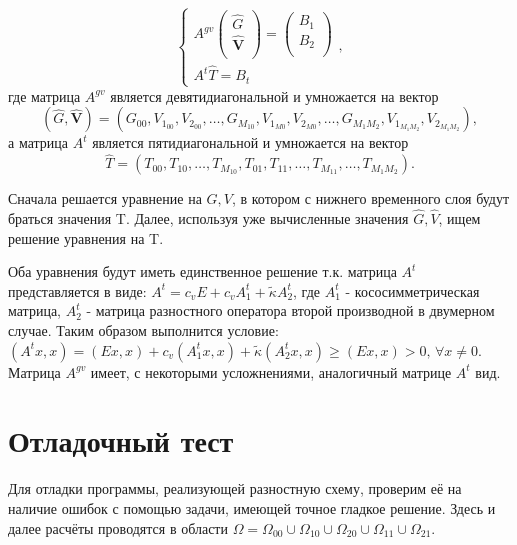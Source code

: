 \documentclass[a4paper]{article}
\theoremstyle{definition}
\numberwithin{equation}{section}
\begin{document}
$$\begin{cases}
A^{gv}
\left( \begin{matrix}
\hat{G}\\
\hat{\mathbf{V}}\\
\end{matrix} \right) = 
\left( \begin{matrix}
B_1\\
B_2\\
\end{matrix} \right) \\
A^t \hat{T} = B_t
\end{cases},$$
где матрица $A^{gv}$ является девятидиагональной и умножается на вектор $$(\hat{G},\hat{\mathbf{V}}) = (G_{00},V_{1_{00}},V_{2_{00}},\dots,G_{M_10},V_{1_{M0}},V_{2_{M0}}, \dots, G_{M_1M_2},V_{1_{M_1M_2}},V_{2_{M_1M_2}}),$$
а матрица $A^t$ является пятидиагональной и умножается на вектор $$\hat{T}=(T_{00},T_{10},\dots,T_{M_10},T_{01}, T_{11}, \dots, T_{M_11},\dots, T_{M_1M_2}).$$

Сначала решается уравнение на $G, V$, в котором с нижнего временного слоя будут браться значения T. Далее, используя уже вычисленные значения $\hat{G}, \hat{V}$, ищем решение уравнения на T.

Оба уравнения будут иметь единственное решение т.к. матрица $A^t$ представляется в виде: $A^t=c_vE + c_vA_1^t + \tilde{\kappa} A_2^t$, где $A_1^t$ - кососимметрическая матрица, $A_2^t$ - матрица разностного оператора второй производной в двумерном случае. Таким образом выполнится условие: $(A^tx,x)= (Ex,x)+c_v(A^t_1x,x)+\tilde{\kappa}(A^t_2x,x)\geq(Ex,x)>0, \, \forall x\neq0$. Матрица $A^{gv}$ имеет, с некоторыми усложнениями, аналогичный матрице $A^t$ вид.







\newpage
\section{Отладочный тест}

Для отладки программы, реализующей разностную схему, проверим её на наличие ошибок с помощью задачи, имеющей точное гладкое решение. Здесь и далее расчёты проводятся в области $\Omega = \Omega_{00}\cup \Omega_{10}\cup \Omega_{20}\cup \Omega_{11}\cup \Omega_{21}$.

\begin{center}
\\
\end{center}
\end{document}
